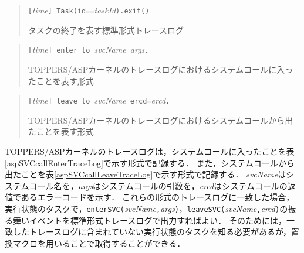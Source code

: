 \begin{table}[p]
\begin{quote}
\begin{breakbox}
{\tt [}{\it time}{\tt ] Task(id==}{\it taskId}{\tt ).exit()}
\end{breakbox}
\caption{タスクの終了を表す標準形式トレースログ}
\label{aspTaskExitTraceLog}
\end{quote}
\end{table}

\begin{table}[p]
\begin{quote}
\begin{breakbox}
{\tt [}{\it time}{\tt ] enter to }{\it svcName}{\tt \ }{\it args}{\tt .}
\end{breakbox}
\caption{TOPPERS/ASPカーネルのトレースログにおけるシステムコールに入ったことを表す形式}
\label{aspSVCcallEnterTraceLog}
\end{quote}
\end{table}

\begin{table}[p]
\begin{quote}
\begin{breakbox}
{\tt [}{\it time}{\tt ] leave to }{\it svcName}{\tt \ ercd=}{\it ercd}{\tt .}
\end{breakbox}
\caption{TOPPERS/ASPカーネルのトレースログにおけるシステムコールから出たことを表す形式}
\label{aspSVCcallLeaveTraceLog}
\end{quote}
\end{table}

TOPPERS/ASPカーネルのトレースログは，システムコールに入ったことを表\ref{aspSVCcallEnterTraceLog}で示す形式で記録する．
また，システムコールから出たことを表\ref{aspSVCcallLeaveTraceLog}で示す形式で記録する．
{\it svcName}はシステムコール名を，{\it args}はシステムコールの引数を，{\it ercd}はシステムコールの返値であるエラーコードを示す．
これらの形式のトレースログに一致した場合，実行状態のタスクで，{\tt enterSVC(}{\it svcName}{\tt ,}{\it args}{\tt )}，{\tt leaveSVC(}{\it svcName}{\tt ,}{\it ercd}{\tt )}の振る舞いイベントを標準形式トレースログで出力すればよい．
そのためには，一致したトレースログに含まれていない実行状態のタスクを知る必要があるが，置換マクロを用いることで取得することができる．

